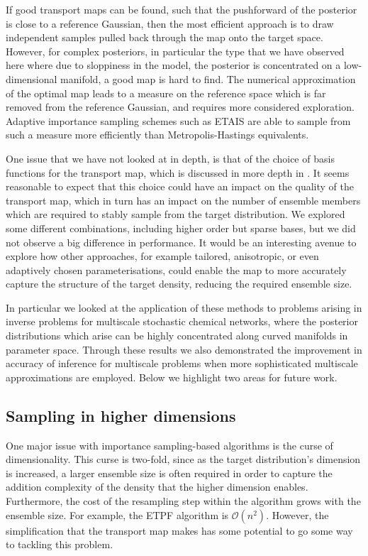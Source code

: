 \documentclass[final]{siamltex}
\newcommand{\edit}[1]{#1}
\begin{document}
\edit{If good transport maps can be found, such that the pushforward
  of the posterior is close to a reference Gaussian, then the most
  efficient approach is to draw independent samples pulled back
  through the map onto the target space. However, for complex
  posteriors, in particular the type that we have observed here where
  due to sloppiness in the model, the posterior is concentrated on a
  low-dimensional manifold, a good map is hard to find. The numerical
  approximation of the optimal map leads to a measure on the reference
  space which is far removed from the reference Gaussian, and requires
  more considered exploration. Adaptive importance sampling schemes
  such as ETAIS are able to sample from such a measure
  more efficiently than Metropolis-Hastings equivalents.}

One issue that we have not looked at in depth, is that of the choice
of basis functions for the transport map, which is discussed in more
depth in \cite{parno2018transport}. It seems reasonable to
expect that this choice could have an impact on the quality of the
transport map, which in turn has an impact on the number of ensemble
members which are required to stably sample from the target
distribution. We explored some different combinations, including higher
order but sparse bases, but we did not observe a big difference in
performance. It would be an interesting avenue to explore how other
approaches, for example tailored, anisotropic, or even adaptively
chosen parameterisations, could enable the map to more accurately
capture the structure of the target density, reducing the required
ensemble size.

In particular we looked at the application of these methods to
problems arising in inverse problems for multiscale stochastic
chemical networks, where the posterior distributions which arise can
be highly concentrated along curved manifolds in parameter
space. Through these results we also demonstrated the improvement in
accuracy of inference for multiscale problems when more sophisticated
multiscale approximations are employed. Below we highlight two areas for future work.

\subsection{Sampling in higher
  dimensions}\label{sec:TETAIS_higher_dim}

One major issue with importance sampling-based algorithms is the curse of
dimensionality. This curse is two-fold, since as the target
distribution's dimension is increased, a larger ensemble size is often
required in order to capture the addition complexity of the density
that the higher dimension enables. Furthermore, the cost of the
resampling step within the algorithm grows with the ensemble size. For
example, the ETPF algorithm is $\mathcal{O}(n^2)$. However, the
simplification that the transport map makes has some potential to go
some way to tackling this problem.
\end{document}
